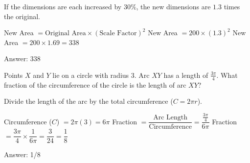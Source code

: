 \documentclass[11pt,paper=a4,answers]{exam}
\begin{document}
\begin{questions}
\begin{center}
\end{center}

\begin{solution}
If the dimensions are each increased by $30\%$, the new dimensions are $1.3$ times the original.
\vspace{5pt}
\begin{center}
New Area $= \text{Original Area} \times (\text{Scale Factor})^2$
\vspace{5pt}
New Area $= 200 \times (1.3)^2$
\vspace{5pt}
New Area $= 200 \times 1.69 = 338$
\end{center}
\vspace{5pt}
Answer: \colorbox{yellow!100}{338}
\end{solution}

\vspace{1cm}

\question
Points $X$ and $Y$ lie on a circle with radius $3$. Arc $XY$ has a length of $\frac{3\pi}{4}$. What fraction of the circumference of the circle is the length of arc $XY$?
\begin{center}
\end{center}

\begin{solution}
Divide the length of the arc by the total circumference ($C = 2\pi r$).
\vspace{5pt}
\begin{center}
Circumference ($C$) $= 2\pi(3) = 6\pi$
\vspace{5pt}
Fraction $= \dfrac{\text{Arc Length}}{\text{Circumference}} = \dfrac{\frac{3\pi}{4}}{6\pi}$
\vspace{5pt}
Fraction $= \dfrac{3\pi}{4} \times \dfrac{1}{6\pi} = \dfrac{3}{24} = \dfrac{1}{8}$
\end{center}
\vspace{5pt}
Answer: \colorbox{yellow!100}{1/8}
\end{solution}


\end{questions}
\end{document}
